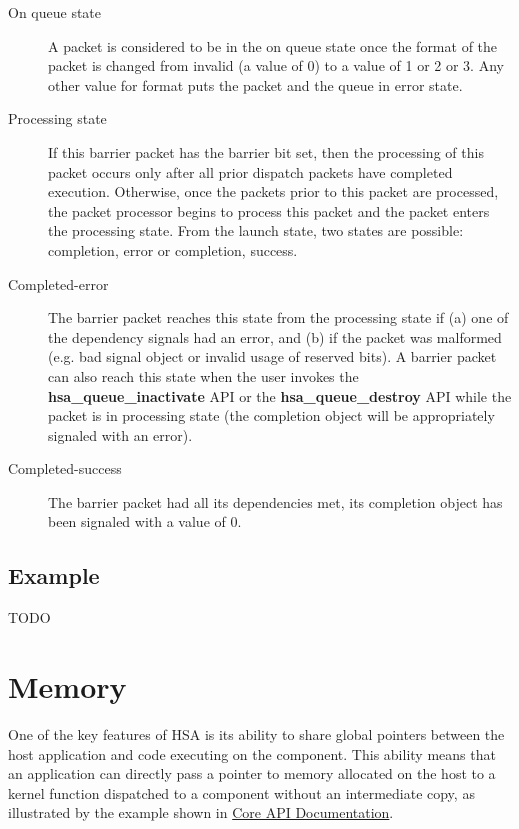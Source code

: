 \documentclass[draft]{book}
\newcommand{\reffun}[1]{\textbf{#1}}
\begin{document}
\begin{description}
\item[On queue state] A packet is considered to be in the on queue state once
  the format of the packet is changed from invalid (a value of 0) to a value of
  1 or 2 or 3. Any other value for format puts the packet and the queue in error
  state.
\item[Processing state] If this barrier packet has the barrier bit set, then the
  processing of this packet occurs only after all prior dispatch packets have
  completed execution. Otherwise, once the packets prior to this packet are
  processed, the packet processor begins to process this packet and the packet
  enters the processing state. From the launch state, two states are possible:
  completion, error or completion, success.
\item[Completed-error] The barrier packet reaches this state from the processing
  state if (a) one of the dependency signals had an error, and (b) if the packet
  was malformed (e.g. bad signal object or invalid usage of reserved bits). A
  barrier packet can also reach this state when the user invokes the
  \reffun{hsa_queue_inactivate} API or the \reffun{hsa_queue_destroy} API
  while the packet is in processing state (the completion object will be
  appropriately signaled with an error).
\item[Completed-success] The barrier packet had all its dependencies met, its
  completion object has been signaled with a value of 0.
\end{description}

\hypertarget{aql-example}{}\subsection{Example}\label{aql-example}
TODO

\section{Memory}\label{memory}\hypertarget{memory}{}

One of the key features of HSA is its ability to share global pointers between
the host application and code executing on the component. This ability means
that an application can directly pass a pointer to memory allocated on the host
to a kernel function dispatched to a component without an intermediate copy, as
illustrated by the example shown in \hyperlink{coreapi}{Core API Documentation}.
\end{document}
